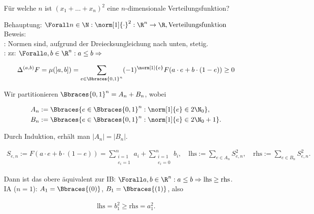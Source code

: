\begin{exercise}

Für welche $n$ ist $(x_1 + \ldots + x_n)^2$ eine $n$-dimensionale Verteilungsfunktion?

\end{exercise}

\begin{solution}

Behauptung: $\Forall n \in \N: \norm[1]{\cdot}^2: \R^n \to \R, \text{Verteilungsfunktion}$ \\

Beweis: \\

: Normen sind, aufgrund der Dreiecksungleichung nach unten, stetig. \\

: zz: $\Forall a, b \in \R^n: a \leq b \Rightarrow$

\begin{align*}
  \Delta^{(a, b)} F
  =
  \mu(]a, b])
  =
  \sum_{e \in \Bbraces{0, 1}^n}
  (-1)^{\norm[1]{e}}
  F(a \cdot e + b \cdot (1 - e)) \geq 0
\end{align*}

Wir partitionieren $\Bbraces{0, 1}^n = A_n + B_n$, wobei

\begin{align*}
  A_n & := \Bbraces{e \in \Bbraces{0, 1}^n: \norm[1]{e} \in 2 \N_0}, \\
  B_n & := \Bbraces{e \in \Bbraces{0, 1}^n: \norm[1]{e} \in 2 \N_0 + 1}.
\end{align*}

Durch Induktion, erhält man $|A_n| = |B_n|$.

\begin{align*}
  S_{e, n}
  :=
  F(a \cdot e + b \cdot (1 - e))
  =
  \sum_{\substack{i = 1 \\ e_i = 1}}^n a_i +
  \sum_{\substack{i = 1 \\ e_i = 0}}^n b_i,
  \quad
  \text{lhs} := \sum_{e \in A_n} S_{e, n}^2,
  \quad
  \text{rhs} := \sum_{e \in B_n} S_{e, n}^2.
\end{align*}

Dann ist das obere  äquivalent zur IB: $\Forall a, b \in \R^n: a \leq b \Rightarrow \text{lhs} \geq \text{rhs}$. \\

IA ($n = 1$): $A_1 = \Bbraces{(0)}$, $B_1 = \Bbraces{(1)}$, also

\begin{align*}
  \text{lhs} = b_1^2 \geq \text{rhs} = a_1^2.
\end{align*}


\end{solution}
